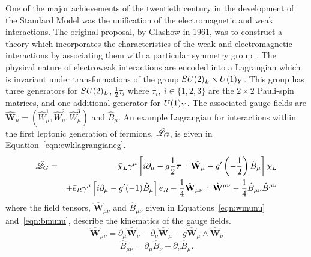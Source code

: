 One of the major achievements of the twentieth century in 
the development of the Standard Model was the unification of the electromagnetic 
and weak interactions. The original proposal, by Glashow in 1961, was
to construct a theory which incorporates the characteristics of 
the weak and electromagnetic interactions by associating them 
with a particular symmetry group~\citep{null}.
The physical nature of electroweak interactions are encoded into a Lagrangian which 
is invariant under transformations of the group $SU(2)_{L}\times U(1)_{Y}$. 
This group has three generators for $SU(2)_{L}$, $\frac{1}{2}\tau_{i}$ 
where $\tau_{i},~i\in \{1,2,3 \}$ are the $2\times2$ Pauli-spin matrices, and one
additional generator for $U(1)_{Y}$. The associated gauge fields are 
$\hat{\mathbf{W}}_{\mu} = \left(\hat{W}_{\mu}^{1},\hat{W}_{\mu}^{2},\hat{W}_{\mu}^{3}\right)$
 and $\hat{B}_{\mu}$.
An example Lagrangian for interactions within the first leptonic generation of fermions, $\hat{\mathscr{L}}_{G}$, is 
given in Equation~\ref{eqn:ewklagrangianeg}.
\begin{eqnarray}
\lagr_{G} & =& \bar{\chi}_{L}\gamma^{\mu}\left[i\partial_{\mu} 
		   - g\frac{1}{2}\boldsymbol{\tau}\cdot\hat{\mathbf{W}_{\mu}}
		   - g^{\prime}\left(-\frac{1}{2}\right)\hat{B}_{\mu}\right] \chi_{L}
\nonumber \\
& &		   + \bar{e}_{R}\gamma^{\mu}\left[i\partial_{\mu} 
		   - g^{\prime}(-1)\hat{B}_{\mu}\right]{e}_{R}
		     -\frac{1}{4}
		     \hat{\mathbf{W}}_{\mu\nu}\cdot\hat{\mathbf{W}}^{\mu\nu} 
		     -\frac{1}{4}
		     \hat{B}_{\mu\nu}\hat{B}^{\mu\nu}
\label{eqn:ewklagrangianeg}
\end{eqnarray}
where the field tensors, $\hat{\mathbf{W}}_{\mu\nu}$ and $\hat{B}_{\mu\nu}$ given in 
Equations~\ref{eqn:wmunu} and~\ref{eqn:bmunu},
describe the kinematics of the gauge fields.
\begin{equation}
\hat{\mathbf{W}}_{\mu\nu} = \partial_{\mu}\hat{\mathbf{W}}_{\nu} - \partial_{\nu}\hat{\mathbf{W}}_{\mu} - g \hat{\mathbf{W}}_{\mu}\wedge\hat{\mathbf{W}}_{\nu}
\label{eqn:wmunu}
\end{equation}
\begin{equation}
\hat{B}_{\mu\nu} = \partial_{\mu}\hat{B}_{\nu} - \partial_{\nu}\hat{B}_{\mu}.
\label{eqn:bmunu}
\end{equation}

